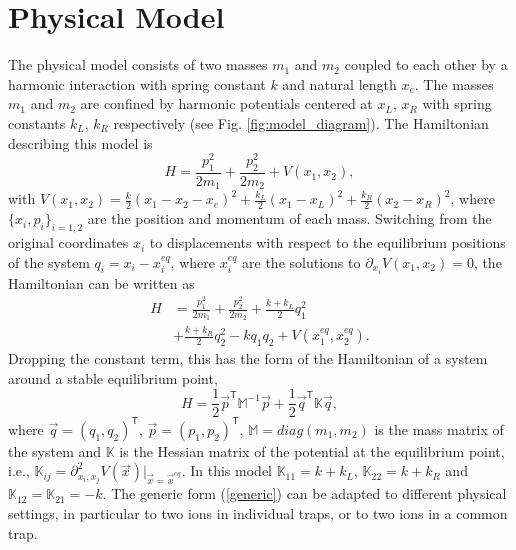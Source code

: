 \section{Physical Model \label{sec:Physical_Model}}
%
%
%
%
The physical model consists of two masses $m_1$ and $m_2$ coupled to each other by a harmonic interaction with spring constant $k$ and natural length $x_e$. The masses $m_1$ and $m_2$ are confined by  harmonic potentials centered at $x_L$, $x_R$ with spring constants $k_L$, $k_R$  respectively (see Fig. \ref{fig:model_diagram}). The Hamiltonian describing this model is
%
\begin{equation}
  H = \frac{p_1^2}{2m_1} + \frac{p_2^2}{2m_2} + V(x_1,x_2),
  \label{eq:chapter6_HamiltonianOriginalCordinates}
\end{equation}
%
with $V(x_1,x_2)=\frac{k}{2}\left( x_1 - x_2 - x_e \right)^2 + \frac{k_L}{2}\left( x_1 - x_L \right)^2 + \frac{k_R}{2}\left( x_2 - x_R \right)^2$,  where $\{x_i,p_i\}_{i=1,2}$ are the position and momentum of each mass. Switching from the original coordinates $x_i$ to displacements with respect to the equilibrium positions of the system $q_i = x_i - x_i^{eq}$, where $x_i^{eq}$ are the solutions to $\partial_{x_i}V(x_1,x_2)=0$, the Hamiltonian can be written as
%
\begin{align}
  H &= \frac{p_1^2}{2m_1} + \frac{p_2^2}{2m_2} + \frac{k+k_L}{2}q_1^2\nonumber\\ &+ \frac{k+k_R}{2}q_2^2 - k q_1 q_2 + V(x_1^{eq},x_2^{eq}).
  \label{eq:chapter6_Hamiltonian}
\end{align}
%
Dropping the constant term, this has the form of  the Hamiltonian of a system around a stable equilibrium point,
%
\begin{equation}
  H = \frac{1}{2} \overrightarrow{p}^\mathsf{T}\mathbb{M}^{-1}\overrightarrow{p} + \frac{1}{2} \overrightarrow{q}^\mathsf{T}\mathbb{K}\overrightarrow{q},
\label{generic}
\end{equation}
%
where $\overrightarrow{q} = \left(q_1,q_2\right)^\mathsf{T}$, $\overrightarrow{p} = \left(p_1,p_2\right)^\mathsf{T}$, $\mathbb{M} = diag(m_1,m_2)$ is the mass matrix of the system and $\mathbb{K}$ is the Hessian matrix of the potential at the equilibrium point, i.e., $\mathbb{K}_{ij} = \partial^2_{x_i,x_j}V(\overrightarrow{x})\Big|_{\overrightarrow{x} = \overrightarrow{x}^{eq}}$. In this model  $\mathbb{K}_{11} = k + k_L$, $\mathbb{K}_{22} = k + k_R$ and $\mathbb{K}_{12} = \mathbb{K}_{21} = -k$. The generic form (\ref{generic}) can be adapted to different physical settings, in particular to two ions in individual traps, or to two ions in a common trap.

